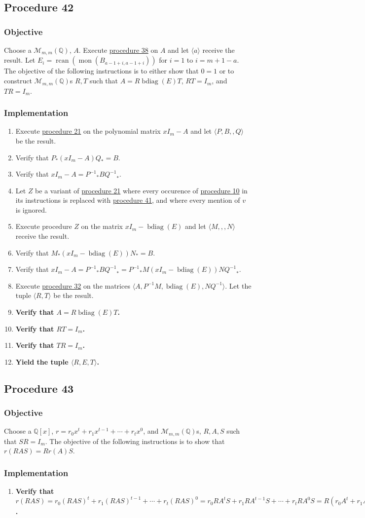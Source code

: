 \documentclass[twocolumn]{article}
\DeclareMathOperator{\bdiag}{bdiag}
\DeclareMathOperator{\rcan}{rcan}
\DeclareMathOperator{\mon}{mon}
\newcommand{\procedure}[2][]{\subsection*{Procedure #2 \ifthenelse{\equal{#1}{}}{}{(#1)}}\label{sec:procedure #2}}
\newcommand{\objective}{\subsubsection*{Objective}}
\newcommand{\implementation}{\subsubsection*{Implementation}}
\begin{document}
		\procedure{42}
			\objective
				Choose a $\mathcal{M}_{m,m}(\mathbb{Q})$, $A$. Execute \hyperref[sec:procedure 38]{procedure 38} on $A$ and let $\langle a\rangle$ receive the result. Let $E_i=\rcan(\mon(B_{a-1+i,a-1+i}))$ for $i=1$ to $i=m+1-a$. The objective of the following instructions is to either show that $0=1$ or to construct $\mathcal{M}_{m,m}(\mathbb{Q})$s $R,T$ such that $A=R\bdiag(E)T$, $RT=I_m$, and $TR=I_m$.
			\implementation
				\begin{enumerate}
					\item Execute \hyperref[sec:procedure 21]{procedure 21} on the polynomial matrix $xI_m-A$ and let $\langle P,B,,Q\rangle$ be the result.
					\item Verify that $P_*(xI_m-A)Q_*=B$.
					\item Verify that $xI_m-A={P^{-1}}_*B{Q^{-1}}_*$.
					\item Let $Z$ be a variant of \hyperref[sec:procedure 21]{procedure 21} where every occurence of \hyperref[sec:procedure 10]{procedure 10} in its instructions is replaced with \hyperref[sec:procedure 41]{procedure 41}, and where every mention of $v$ is ignored.
					\item Execute procedure $Z$ on the matrix $xI_m-\bdiag(E)$ and let $\langle M,,,N\rangle$ receive the result.
					\item Verify that $M_*(xI_m-\bdiag(E))N_*=B$.
					\item Verify that $xI_m-A={P^{-1}}_*B{Q^{-1}}_*={P^{-1}}_*M(xI_m-\bdiag(E))N{Q^{-1}}_*$.
					\item Execute \hyperref[sec:procedure 32]{procedure 32} on the matrices $\langle A,{P}^{-1}M,\bdiag(E),N{Q}^{-1}\rangle$. Let the tuple $\langle R,T\rangle$ be the result.
					\item \textbf{Verify that $A=R\bdiag(E)T$.}
					\item \textbf{Verify that $RT=I_m$.}
					\item \textbf{Verify that $TR=I_m$.}
					\item \textbf{Yield the tuple $\langle R,E,T\rangle$.}
				\end{enumerate}
		\procedure{43}
			\objective
				Choose a $\mathbb{Q}[x]$, $r=r_0x^t+r_1x^{t-1}+\cdots+r_tx^0$, and $\mathcal{M}_{m,m}(\mathbb{Q})$s, $R,A,S$ such that $SR=I_m$. The objective of the following instructions is to show that $r(RAS)=Rr(A)S$.
			\implementation
				\begin{enumerate}
					\item \textbf{Verify that $r(RAS)=r_0(RAS)^t+r_1(RAS)^{t-1}+\cdots+r_t(RAS)^0=r_0RA^tS+r_1RA^{t-1}S+\cdots+r_tRA^0S=R(r_0A^t+r_1A^{t-1}+\cdots+r_tA^0)S=Rr(A)S$.}
				\end{enumerate}
\end{document}

